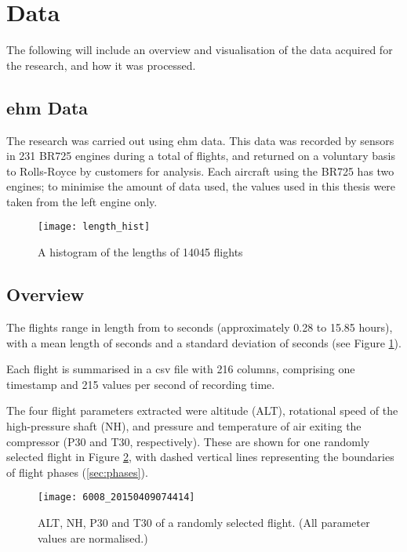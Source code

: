 \section{Data}
The following will include an overview and visualisation of the data acquired for the research, and how it was processed.

\subsection{\ac{ehm} Data}
The research was carried out using \ac{ehm} data. This data was recorded by sensors in 231 BR725 engines during a total of  flights, and returned on a voluntary basis to Rolls-Royce by customers for analysis. Each aircraft using the BR725 has two engines; to minimise the amount of data used, the values used in this thesis were taken from the left engine only.

\begin{figure}
    \centering
    \texttt{[image: length\_hist]}
    \caption{\label{fig:flt_len} A histogram of the lengths of 14045 flights}
\end{figure}

\subsection{Overview}
The flights range in length from  to  seconds (approximately 0.28 to 15.85 hours), with a mean length of  seconds and a standard deviation of  seconds (see Figure \ref{fig:flt_len}).

Each flight is summarised in a \ac{csv} file with 216 columns, comprising one timestamp and 215 values per second of recording time.

The four flight parameters extracted were altitude (ALT), rotational speed of the high-pressure shaft (NH), and pressure and temperature of air exiting the compressor (P30 and T30, respectively). These are shown for one randomly selected flight in Figure \ref{fig:flt_example}, with dashed vertical lines representing the boundaries of flight phases (\ref{sec:phases}).

\begin{figure}
    \centering
    \texttt{[image: 6008\_20150409074414]}
    \caption{\label{fig:flt_example} ALT, NH, P30 and T30 of a randomly selected flight. (All parameter values are normalised.)}
\end{figure}


